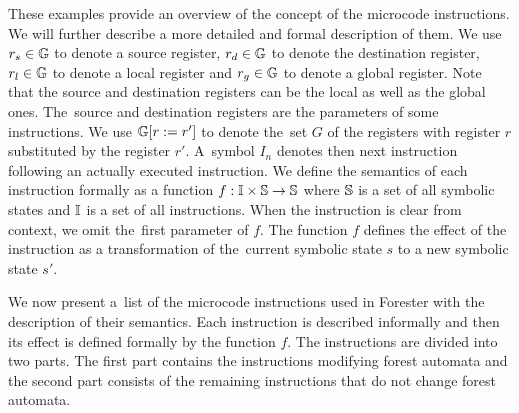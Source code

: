 These examples provide an overview of the concept of the microcode instructions.
We will further describe a more detailed and formal description of them.
We use $r_s \in \mathbb{G}$ to denote a source register,
$r_d \in \mathbb{G}$ to denote the destination register,
$r_l \in \mathbb{G}$ to denote a local register and
$r_g \in \mathbb{G}$ to denote a global register.
Note that the source and destination registers can be the local as well as the global ones.
The~source and destination registers are the parameters of some instructions.
We use $\mathbb{G} [r := r']$ to denote the~set $G$ of the registers with
register $r$ substituted by the register $r'$.
A~symbol $I_n$ denotes then next instruction following an actually executed instruction.
We define the semantics of each instruction formally as a function 
$f: \mathbb{I} \times \mathbb{S} \rightarrow \mathbb{S}$
where $\mathbb{S}$ is a set of all symbolic states and $\mathbb{I}$ is a set of all instructions.
When the instruction is clear from context, we omit the~first parameter of $f$.
The function $f$ defines the effect of the instruction as a transformation of
the~current symbolic state $s$ to a new symbolic state $s'$.

We now present a~list of the microcode instructions used in Forester
with the description of their semantics.
Each instruction is described informally and
then its effect is defined formally by the function $f$.
The instructions are divided into two parts.
The first part contains the instructions modifying forest automata
and the second part consists of the remaining instructions
that do not change forest automata.

